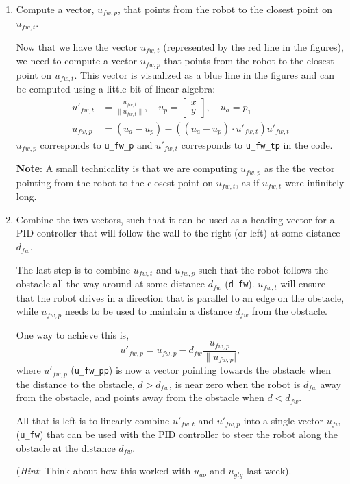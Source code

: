 \documentclass[10pt]{article}
\begin{document}
\begin{enumerate}
	\item Compute a vector, $u_{fw,p}$, that points from the robot to the closest point on $u_{fw,t}$.
	
	Now that we have the vector $u_{fw,t}$ (represented by the red line in the figures), we need to compute a vector $u_{fw,p}$ that points from the robot to the closest point on $u_{fw,t}$. This vector is visualized as a blue line in the figures and can be computed using a little bit of linear algebra:
	\begin{equation*}
		\begin{split}
			u'_{fw,t} &= \frac{u_{fw,t}}{\|u_{fw,t}\|}, \quad u_p = \begin{bmatrix} x \\ y \end{bmatrix}, \quad u_a = p_1 \\
			u_{fw,p} &= (u_a-u_p)-((u_a-u_p)\cdot u'_{fw,t})u'_{fw,t}
		\end{split}
	\end{equation*}
	$u_{fw,p}$ corresponds to \texttt{u\_fw\_p} and $u'_{fw,t}$ corresponds to \texttt{u\_fw\_tp} in the code. 
	
	\textbf{Note}: A small technicality is that we are computing $u_{fw,p}$ as the the vector pointing from the robot to the closest point on $u_{fw,t}$, as if $u_{fw,t}$ were infinitely long.
	
	\item Combine the two vectors, such that it can be used as a heading vector for a PID controller that will follow the wall to the right (or left) at some distance $d_{fw}$.
	
	The last step is to combine $u_{fw,t}$ and $u_{fw,p}$ such that the robot follows the obstacle all the way around at some distance $d_{fw}$ (\texttt{d\_fw}). $u_{fw,t}$ will ensure that the robot drives in a direction that is parallel to an edge on the obstacle, while $u_{fw,p}$ needs to be used to maintain a distance $d_{fw}$ from the obstacle.
	
	One way to achieve this is,
	\begin{equation*}
		u'_{fw,p} = u_{fw,p}-d_{fw}\frac{u_{fw,p}}{\|u_{fw,p}|},
	\end{equation*} 
	where $u'_{fw,p}$ (\texttt{u\_fw\_pp}) is now a vector pointing towards the obstacle when the distance to the obstacle, $d>d_{fw}$, is near zero when the robot is $d_{fw}$ away from the obstacle, and points away from the obstacle when $d<d_{fw}$.
	
	All that is left is to linearly combine $u'_{fw,t}$ and $u'_{fw,p}$ into a single vector $u_{fw}$ (\texttt{u\_fw}) that can be used with the PID controller to steer the robot along the obstacle at the distance $d_{fw}$.
	
	(\textit{Hint}: Think about how this worked with $u_{ao}$ and $u_{gtg}$ last week).	
\end{enumerate}
\end{document}

